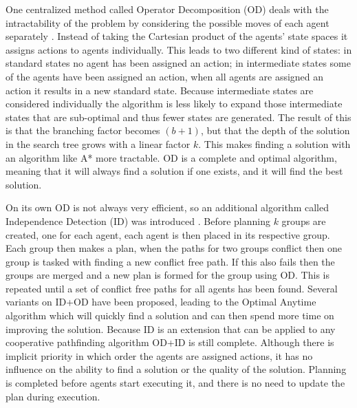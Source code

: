 One centralized method called Operator Decomposition (OD) deals with the
intractability of the problem by considering the possible moves of each agent
separately \cite{standley2010,standley2011}. Instead of taking the Cartesian
product of
the agents' state spaces it assigns actions to agents individually. This leads
to two different kind of states: in standard states no agent has been assigned
an action; in intermediate states some of the agents have been assigned an
action, when all agents are assigned an action it results in a new standard
state. Because intermediate states are considered individually the algorithm is
less likely to expand those intermediate states that are sub-optimal and thus
fewer states are generated. The result of this is that the branching factor
becomes $(b+1)$, but that the depth of the solution in the search tree grows
with a linear factor $k$. This makes finding a solution with an algorithm like
A* more tractable. OD is a complete and optimal algorithm, meaning that it will
always find a solution if one exists, and it will find the best solution.

On its own OD is not always very efficient, so an additional algorithm called
Independence Detection (ID) was introduced \cite{standley2010}. Before planning
$k$ groups are created, one for each agent, each agent is then placed in its
respective group. Each group then makes a
plan, when the paths for two groups conflict then one group is tasked with
finding a new conflict free path. If this also fails then the groups are merged
and a new plan is formed for the group using OD. This is repeated until a
set of conflict free paths for all agents has been found. Several variants on
ID+OD have been proposed, leading to the Optimal Anytime algorithm
\cite{standley2011} which will quickly find a solution and can then spend more
time on improving the solution. Because ID is an extension that can be applied
to any cooperative pathfinding algorithm OD+ID is still complete. Although
there is implicit priority in which order the agents are assigned actions, it
has no influence on the ability to find a solution or the quality of the
solution. Planning is completed before agents start executing it, and there is
no need to update the plan during execution.

